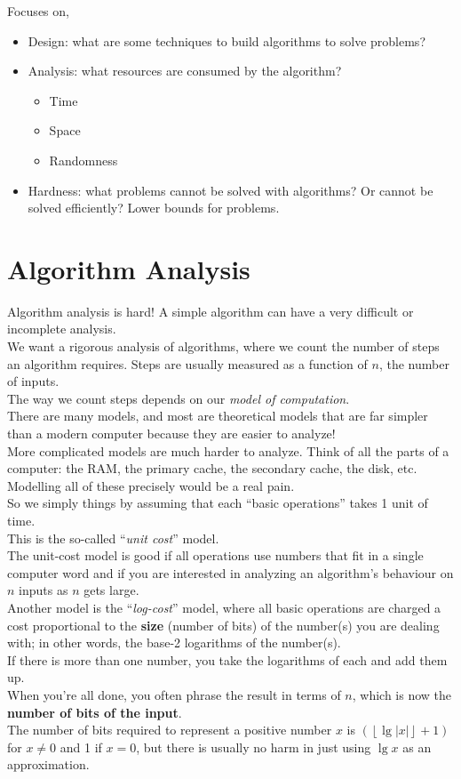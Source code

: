 \documentclass[12pt]{article}
\theoremstyle{plain}
\theoremstyle{definition}
\newcommand{\floor}[1]{\ensuremath{\left\lfloor #1 \right\rfloor}}
\begin{document}
Focuses on,
\begin{itemize}
  \item Design: what are some techniques to build algorithms to solve problems?
  \item Analysis: what resources are consumed by the algorithm?
  \begin{itemize}
    \item Time
    \item Space
    \item Randomness
  \end{itemize}
  \item Hardness: what problems cannot be solved with algorithms? Or cannot be solved efficiently? Lower bounds for problems.
\end{itemize}

\newpage
\section{Algorithm Analysis}
Algorithm analysis is hard!
A simple algorithm can have a very difficult or incomplete analysis. \\

We want a rigorous analysis of algorithms, where we count the number of steps an algorithm requires.
Steps are usually measured as a function of $n$, the number of inputs. \\

The way we count steps depends on our \emph{model of computation}. \\
There are many models, and most are theoretical models that are far simpler than a modern computer because they are easier to analyze! \\
More complicated models are much harder to analyze.
Think of all the parts of a computer: the RAM, the primary cache, the secondary cache, the disk, etc.
Modelling all of these precisely would be a real pain. \\
So we simply things by assuming that each ``basic operations'' takes 1 unit of time. \\
This is the so-called ``\emph{unit cost}'' model. \\

The unit-cost model is good if all operations use numbers that fit in a single computer word and if you are interested in analyzing an algorithm's behaviour on $n$ inputs as $n$ gets large. \\

Another model is the ``\emph{log-cost}'' model, where all basic operations are charged a cost proportional to the \textbf{size} (number of bits) of the number(s) you are dealing with;
in other words, the base-2 logarithms of the number(s). \\
If there is more than one number, you take the logarithms of each and add them up. \\
When you're all done, you often phrase the result in terms of $n$, which is now the \textbf{number of bits of the input}. \\
The number of bits required to represent a positive number $x$ is $(\floor{\lg{|x|}} + 1)$ for $x \neq 0$ and 1 if $x = 0$, but there is usually no harm in just using $\lg{x}$ as an approximation.
\end{document}
